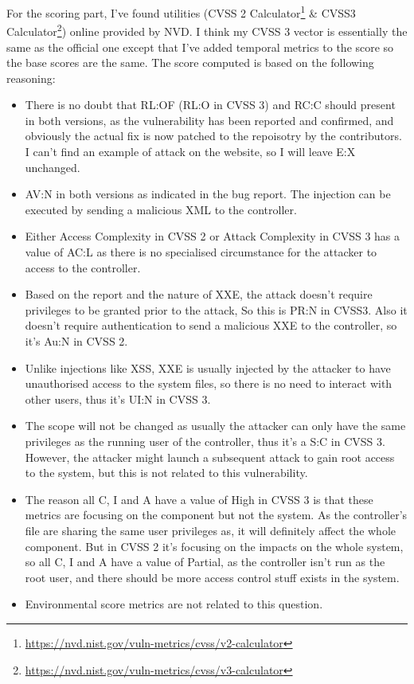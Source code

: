 \documentclass[12pt]{article}
\begin{document}
For the scoring part, I've found utilities (CVSS 2 Calculator\footnote{\url{https://nvd.nist.gov/vuln-metrics/cvss/v2-calculator}} \& CVSS3 Calculator\footnote{\url{https://nvd.nist.gov/vuln-metrics/cvss/v3-calculator}}) online provided by NVD. I think my CVSS 3 vector is essentially the same as the official one except that I've added temporal metrics to the score so the base scores are the same. The score computed is based on the following reasoning:
\begin{itemize}
  \item There is no doubt that RL:OF (RL:O in CVSS 3) and RC:C should present in both versions, as the vulnerability has been reported and confirmed, and obviously the actual fix is now patched to the repoisotry by the contributors. I can't find an example of attack on the website, so I will leave E:X unchanged.
  \item AV:N in both versions as indicated in the bug report. The injection can be executed by sending a malicious XML to the controller.
  \item Either Access Complexity in CVSS 2 or Attack Complexity in CVSS 3 has a value of AC:L as there is no specialised circumstance for the attacker to access to the controller.
  \item Based on the report and the nature of XXE, the attack doesn't require privileges to be granted prior to the attack, So this is PR:N in CVSS3. Also it doesn't require authentication to send a malicious XXE to the controller, so it's Au:N in CVSS 2.
  \item Unlike injections like XSS, XXE is usually injected by the attacker to have unauthorised access to the system files, so there is no need to interact with other users, thus it's UI:N in CVSS 3.
  \item The scope will not be changed as usually the attacker can only have the same privileges as the running user of the controller, thus it's a S:C in CVSS 3. However, the attacker might launch a subsequent attack to gain root access to the system, but this is not related to this vulnerability.
  \item The reason all C, I and A have a value of High in CVSS 3 is that these metrics are focusing on the component but not the system. As the controller's file are sharing the same user privileges as, it will definitely affect the whole component. But in CVSS 2 it's focusing on the impacts on the whole system, so all C, I and A have a value of Partial, as the controller isn't run as the root user, and there should be more access control stuff exists in the system.
  \item Environmental score metrics are not related to this question.
\end{itemize}
\end{document}
